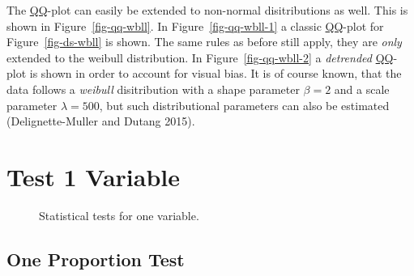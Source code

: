 \documentclass[
  a4paper,
]{scrbook}
\begin{document}
The \hyperref[qq]{QQ}-plot can easily be extended to non-normal
disitributions as well. This is shown in Figure~\ref{fig-qq-wbll}. In
Figure~\ref{fig-qq-wbll-1} a classic \hyperref[qq]{QQ}-plot for
Figure~\ref{fig-ds-wbll} is shown. The same rules as before still apply,
they are \emph{only} extended to the weibull distribution. In
Figure~\ref{fig-qq-wbll-2} a \emph{detrended} \hyperref[qq]{QQ}-plot is
shown in order to account for visual bias. It is of course known, that
the data follows a \emph{weibull} disitribution with a shape parameter
\(\beta=2\) and a scale parameter \(\lambda = 500\), but such
distributional parameters can also be estimated (Delignette-Muller and
Dutang 2015).

\section{Test 1 Variable}\label{test-1-variable}

\begin{figure}[H]


\caption{\label{fig-tests-OneVar}Statistical tests for one variable.}

\end{figure}%

\subsection{One Proportion Test}\label{one-proportion-test}

\begin{table}

\caption{\label{tbl-prop-test-data}The raw data for the proportion
test.}


\end{table}%
\end{document}
